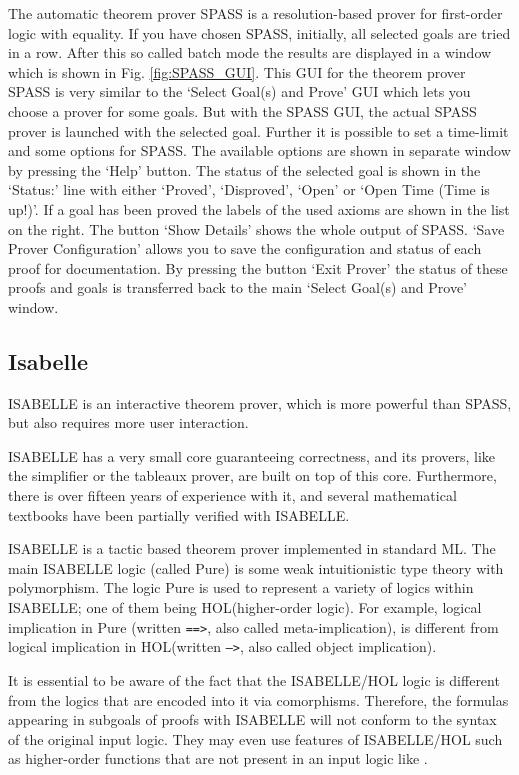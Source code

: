\documentclass{article}
\newcommand{\normalTEXTSC}[2]{{#1\scriptsize#2}}
\newcommand     {\HOL}{\normalTEXTSC{H}{OL}\xspace}
\newcommand     {\Isabelle}{\normalTEXTSC{I}{SABELLE}\xspace}
\begin{document}
The automatic theorem prover SPASS
\cite{WeidenbachEtAl02} is a resolution-based prover for first-order logic
with equality. 
If you have chosen SPASS, initially, all selected goals are tried in a
row. After this so called batch mode the results are displayed in a
window which is shown in Fig. \ref{fig:SPASS_GUI}. This GUI for the
theorem prover SPASS is very similar to the `Select Goal(s) and
Prove' GUI which lets you choose a prover for some goals. But with the
SPASS GUI, the actual SPASS prover is launched with the selected
goal. Further it is possible to set a time-limit and some options for
SPASS. The available options are shown in separate window by pressing
the `Help' button. The status of the selected goal is shown in the
`Status:' line with either `Proved', `Disproved', `Open' or `Open Time
(Time is up!)'. If a goal has been proved the labels of the used
axioms are shown in the list on the right. The button `Show Details'
shows the whole output of SPASS. `Save Prover Configuration' allows you
to save the configuration and status of each proof for
documentation. By pressing the button `Exit Prover' the status of
these proofs and goals is transferred back to the main `Select Goal(s)
and Prove' window.

\subsection*{Isabelle}

\Isabelle \cite{NipPauWen02} is an interactive theorem prover, which is
more powerful than SPASS, but also requires more user interaction.

\Isabelle 
has a very small core guaranteeing correctness, and its provers,
like the simplifier or the tableaux prover, are built on top of this
core. Furthermore, there is over fifteen years of experience with it,
and several mathematical textbooks have been partially 
verified with
\Isabelle. 

\Isabelle is a tactic based theorem prover implemented in standard ML.
The main \Isabelle logic (called Pure) is some weak intuitionistic type
theory with polymorphism. The logic Pure is used to represent a
variety of logics within \Isabelle; one of them being \HOL (higher-order
logic).  For example, logical implication in Pure (written
\texttt{==>}, also called meta-implication), is different from logical
implication in \HOL (written \texttt{-->}, also called object
implication).

It is essential to be aware of the fact that the \Isabelle/\HOL logic
is different from the logics that are encoded into it via comorphisms.
Therefore, the formulas appearing in subgoals of proofs with \Isabelle
will not conform to the syntax of the original input logic.  They may
even use features of \Isabelle/\HOL such as higher-order functions
that are not present in an input logic like \CASL.
\end{document}
